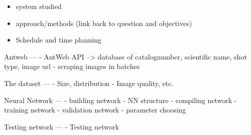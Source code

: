 \begin{itemize}
\item system studied 
\item approach/methods (link back to question and objectives) 
\item Schedule and time planning 
\end{itemize}

Antweb
---
- AntWeb API --> database of catalognumber, scientific name, shot type, image url
- scraping images in batches

The dataset
--- 
- Size, distribution
- Image quality, etc.

Neural Network
---
- building network - NN structure
- compiling network
- training network
- validation network
- parameter choosing

Testing network
---
- Testing network